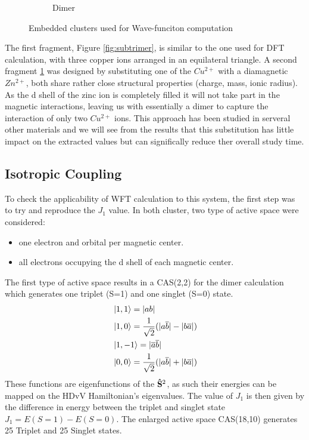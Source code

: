 \documentclass[12pt]{report}
\numberwithin{equation}{section}
\begin{document}
\begin{figure}
\begin{subfigure}{.5\textwidth}
      \caption{Dimer}
      \label{fig:subdimer}
    \end{subfigure}
    \caption{Embedded clusters used for Wave-funciton computation}
    \label{fig:FragmentWF}
    \end{figure}

The first fragment, Figure \ref{fig:subtrimer}, is similar to the one used for DFT calculation, with three copper ions arranged in an equilateral triangle. 
A second fragment \ref{fig:subdimer} was designed by substituting one of the $Cu^{2+}$ with a diamagnetic $Zn^{2+}$, both share rather close structural properties (charge, mass, ionic radius).
As the d shell of the zinc ion is completely filled it will not take part in the magnetic interactions, leaving us with essentially a dimer to capture the interaction of only two $Cu^{2+}$ ions. 
This approach has been studied in serveral other materials and we will see from the results that this substitution has little impact on the extracted values but can significally reduce ther overall study time.

\subsection{Isotropic Coupling}

To check the applicability of WFT calculation to this system, the first step was to try and reproduce the $J_1$ value.
In both cluster, two type of active space were considered:
\begin{itemize}
    \item one electron and orbital per magnetic center.
    \item all electrons occupying the d shell of each magnetic center.
\end{itemize}

The first type of active space results in a CAS(2,2) for the dimer calculation which generates one triplet (S=1) and one singlet (S=0) state.
\begin{align}
    &\ket{1,1}=|ab|\\
    &\ket{1,0}=\frac{1}{\sqrt{2}}(|a\overline{b}|-|b\overline{a}|)\\
    &\ket{1,-1}=|\overline{a}\overline{b}|\\
    &\ket{0,0}=\frac{1}{\sqrt{2}}(|a\overline{b}|+|b\overline{a}|)
\end{align}
These functions are eigenfunctions of the $\vb{\hat{S}}^2$, as such their energies can be mapped on the HDvV Hamiltonian's eigenvalues.
The value of $J_1$ is then given by the difference in energy between the triplet and singlet state $J_1=E(S=1)-E(S=0)$.
The enlarged active space CAS(18,10) generates 25 Triplet and 25 Singlet states.
\end{document}
